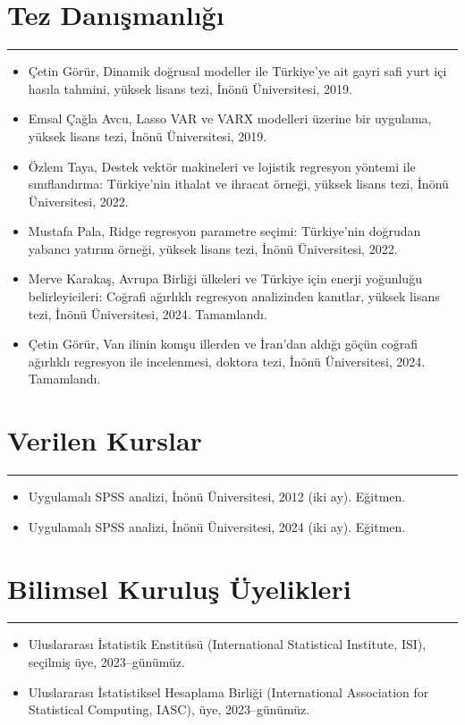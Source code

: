 \documentclass[10pt,a4paper]{article}
\newcommand{\NewPart}[2]{%
	\Needspace{7\baselineskip}%
	\vspace{0.45em}%
	\section*{\sffamily\large\bfseries\color{MidnightBlue}#1 #2}%
	\vspace{-0.7em}\noindent\color{MidnightBlue}\rule{\textwidth}{0.55pt}\color{Black}\vspace{0.25em}}
\begin{document}


\NewPart{Tez Danışmanlığı}{}
\begin{itemize}


\item Çetin Görür, Dinamik doğrusal modeller ile Türkiye'ye ait gayri safi yurt içi hasıla tahmini, yüksek lisans tezi, İnönü Üniversitesi, 2019.
\item Emsal Çağla Avcu, Lasso VAR ve VARX modelleri üzerine bir uygulama, yüksek lisans tezi, İnönü Üniversitesi, 2019.
\item Özlem Taya, Destek vektör makineleri ve lojistik regresyon yöntemi ile sınıflandırma: Türkiye'nin ithalat ve ihracat örneği, yüksek lisans tezi, İnönü Üniversitesi, 2022.
\item Mustafa Pala, Ridge regresyon parametre seçimi: Türkiye'nin doğrudan yabancı yatırım örneği, yüksek lisans tezi, İnönü Üniversitesi, 2022.
\item Merve Karakaş, Avrupa Birliği ülkeleri ve Türkiye için enerji yoğunluğu belirleyicileri: Coğrafi ağırlıklı regresyon analizinden kanıtlar, yüksek lisans tezi, İnönü Üniversitesi, 2024. Tamamlandı.
\item Çetin Görür, Van ilinin komşu illerden ve İran'dan aldığı göçün coğrafi ağırlıklı regresyon ile incelenmesi, doktora tezi, İnönü Üniversitesi, 2024. Tamamlandı.




\end{itemize}


\NewPart{Verilen Kurslar}{}

\begin{itemize}
\item Uygulamalı SPSS analizi, İnönü Üniversitesi, 2012 (iki ay). Eğitmen.
\item Uygulamalı SPSS analizi, İnönü Üniversitesi, 2024 (iki ay). Eğitmen.
\end{itemize}

\NewPart{Bilimsel Kuruluş Üyelikleri}{}

\begin{itemize}

\item Uluslararası İstatistik Enstitüsü (International Statistical Institute, ISI), seçilmiş üye, 2023--günümüz.
\item Uluslararası İstatistiksel Hesaplama Birliği (International Association for Statistical Computing, IASC), üye, 2023--günümüz.

\end{itemize}
\end{document}
